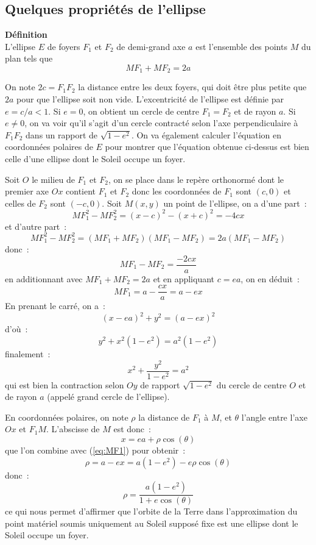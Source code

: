 \documentclass[a4paper,11pt]{article}
\begin{document}
\subsection{Quelques propriétés de l'ellipse}
{\bf D\'efinition}\\
L'ellipse $E$ de foyers $F_1$ et $F_2$ de demi-grand axe
$a$ est l'ensemble des points $M$ du plan tels que 
\[ MF_1+MF_2=2a\]

On note $2c=F_1F_2$ la distance entre les deux foyers, qui doit \^etre
plus petite que $2a$ pour que l'ellipse soit non vide.
L'excentricit\'e de l'ellipse est d\'efinie par $e=c/a < 1$. Si $e=0$,
on obtient un cercle de centre $F_1=F_2$ et de rayon $a$. Si $e\neq 0$,
on va voir qu'il s'agit d'un cercle contracté
selon l'axe perpendiculaire \`a $F_1F_2$ dans un rapport de 
$\sqrt{1-e^2}$. On va \'egalement calculer l'\'equation en
coordonn\'ees polaires de $E$ pour montrer que l'\'equation obtenue
ci-dessus est bien celle d'une ellipse dont le Soleil occupe un foyer.

Soit $O$ le milieu de $F_1$ et $F_2$, on se place dans le rep\`ere orthonorm\'e
dont le premier axe $Ox$ contient $F_1$ et $F_2$ donc les
coordonn\'ees de $F_1$ sont $(c,0)$ et celles de $F_2$ sont $(-c,0)$. 
Soit $M(x,y)$ un
point de l'ellipse, on a d'une part~:
\[ MF_1^2 - MF_2^2 = (x-c)^2-(x+c)^2 = -4cx \]
et d'autre part~:
\[ MF_1^2 - MF_2^2 = (MF_1 + MF_2)(MF_1 - MF_2 ) = 2a (MF_1 - MF_2 )\]
donc~:
\[ MF_1 - MF_2 = \frac{-2cx}{a} \]
en additionnant avec $MF_1+MF_2=2a$ et en appliquant $c=ea$, on en d\'eduit~:
\begin{equation} \label{eq:MF1}
 MF_1 = a - \frac{cx}{a} = a-ex 
\end{equation}
En prenant le carr\'e, on a~:
\[ (x-ea)^2 + y^2 = (a-ex)^2\]
d'o\`u~:
\[ y^2 + x^2 (1-e^2) = a^2(1-e^2) \]
finalement~:
\[ x^2 + \frac{y^2}{1-e^2} = a^2 \]
qui est bien la contraction selon $Oy$ de rapport $\sqrt{1-e^2}$ du
cercle de centre $O$ et de rayon $a$ (appel\'e grand cercle de
l'ellipse).

En coordonn\'ees polaires, on note $\rho$ la distance de $F_1$ \`a
$M$, et $\theta$ l'angle entre l'axe $Ox$ et $F_1M$. L'abscisse de $M$
est donc~:
\[ x= ea + \rho \cos(\theta)\]
que l'on combine avec (\ref{eq:MF1}) pour obtenir~:
\[ \rho = a-ex =a(1-e^2) - e \rho \cos(\theta) \]
donc~:
\[ \rho = \frac{a(1-e^2)}{1+e\cos(\theta)} \]
ce qui nous permet d'affirmer que l'orbite de la Terre dans
l'approximation du point mat\'eriel soumis uniquement au Soleil
suppos\'e fixe est une ellipse dont le Soleil occupe un foyer.
\end{document}
